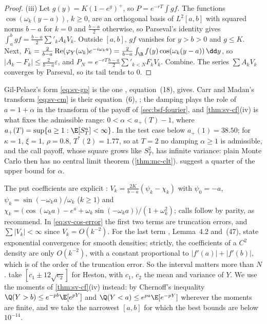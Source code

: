 \begin{proof}
(iii) Let $g(y)=K(1-e^y)^+$, so $P=e^{-rT}\int gf$. The functions $\cos(\omega_k(y-a))$, $k\ge0$, are an
orthogonal basis of $L^2[a,b]$ with squared norms $b-a$ for $k=0$ and $\frac{b-a}2$ otherwise, so Parseval's
identity gives $\int_a^bgf=\frac{b-a}2\sum'_kA_kV_k$. Outside $[a,b]$, $gf$ vanishes for $y>b>0$ and $g\le K$.
Next, $F_k=\frac2{b-a}\operatorname{Re}(\varphi_Y(\omega_k)e^{-i\omega_ka})=\frac2{b-a}\int_\R f(y)\cos(\omega_k(y-a))\,\dd y$,
so $|A_k-F_k|\le\frac2{b-a}\varepsilon$, and $P_N=e^{-rT}\frac{b-a}2\sum'_{k<N}F_kV_k$. Combine. The series
$\sum A_kV_k$ converges by Parseval, so its tail tends to $0$.
\end{proof}

Gil-Pelaez's form \eqref{eq:sv-gp} is the one \textcite{heston}, equation~(18), gives. Carr and Madan's
transform \eqref{eq:sv-cm} is their equation~(6), \citet[Section~3.1]{carr-madan-fft}; the damping plays
the role of $a=1+\alpha$ in the transform of the payoff of \cref{sec:bsf-fourier}, and
\cref{thm:sv-cf}(iv) is what fixes the admissible range: $0<\alpha<a_+(T)-1$, where
$a_+(T)=\sup\{a\ge1:\E[S_T^a]<\infty\}$. In the test case below $a_+(1)=38.50$; for $\kappa=1$, $\xi=1$,
$\rho=0.8$, $T^*(2)=1.77$, so at $T=2$ no damping $\alpha\ge1$ is admissible, and the call payoff, whose
square grows like $S_T^2$, has infinite variance: plain Monte Carlo then has no central limit theorem
(\cref{thm:mc-clt}). \textcite{carr-madan-fft} suggest a quarter of the upper bound for $\alpha$.

The put coefficients are explicit \citep[(20)--(25)]{fang-oosterlee}: $V_k=\frac{2K}{b-a}(\psi_k-\chi_k)$ with
$\psi_0=-a$, $\psi_k=\sin(-\omega_ka)/\omega_k$ ($k\ge1$) and
$\chi_k=\big(\cos(\omega_ka)-e^a+\omega_k\sin(-\omega_ka)\big)/(1+\omega_k^2)$; calls follow by parity, as
\textcite{fang-oosterlee} recommend. In \eqref{eq:sv-cos-error} the first two terms are truncation errors, and
$\sum|V_k|<\infty$ since $V_k=O(k^{-2})$. For the last term \textcite{fang-oosterlee}, Lemma~4.2 and~(47), state
exponential convergence for smooth densities; strictly, the coefficients of a $C^2$ density are only
$O(k^{-2})$, with a constant proportional to $|f'(a)|+|f'(b)|$, which is of the order of the truncation error. So
the interval matters more than $N$.
\textcite{fang-oosterlee} take $[c_1\pm12\sqrt{c_2}]$ for Heston, with $c_1$, $c_2$ the mean and variance of
$Y$. We use the moments of \cref{thm:sv-cf}(iv) instead: by Chernoff's inequality $\Q(Y>b)\le e^{-pb}\E[e^{pY}]$
and $\Q(Y<a)\le e^{pa}\E[e^{-pY}]$ wherever the moments are finite, and we take the narrowest $[a,b]$ for which
the best bounds are below $10^{-14}$.

